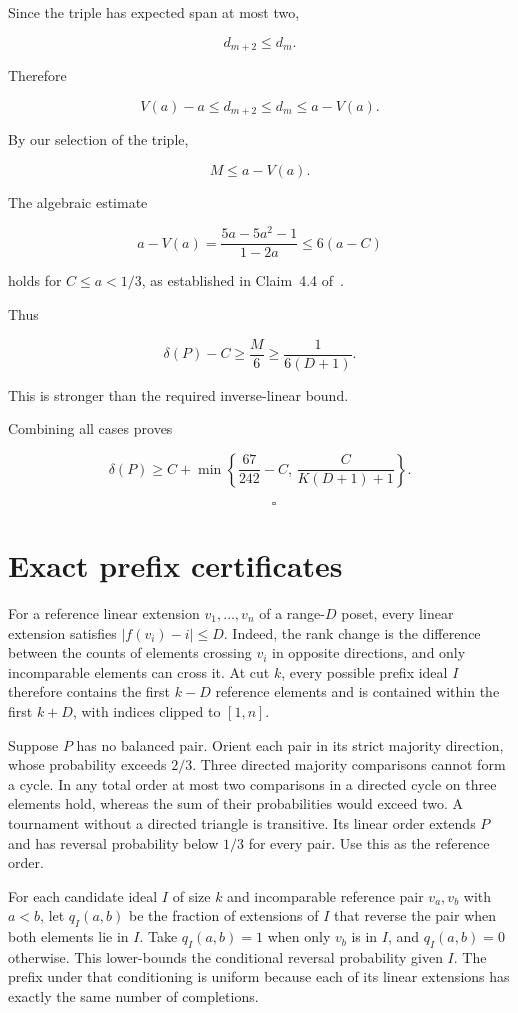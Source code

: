 \documentclass[11pt]{article}
\begin{document}
Since the triple has expected span at most two,

\[
d_{m+2}\leq d_m.
\]

Therefore

\[
V(a)-a\leq d_{m+2}
\leq d_m\leq a-V(a).
\]

By our selection of the triple,

\[
M\leq a-V(a).
\]

The algebraic estimate

\[
a-V(a)
=
\frac{5a-5a^2-1}{1-2a}
\leq6(a-C)
\]

holds for \(C\leq a<1/3\), as established in Claim~4.4 of~\cite{ACPP}.

Thus

\[
\delta(P)-C\geq\frac M6
\geq\frac1{6(D+1)}.
\]

This is stronger than the required inverse-linear bound.

Combining all cases proves

\[
\boxed{
\delta(P)\geq
C+\min\left\{
\frac{67}{242}-C,\,
\frac{C}{K(D+1)+1}
\right\}.
}
\]

\[
\qquad\square
\]

\section{Exact prefix certificates}

For a reference linear extension $v_1,\ldots,v_n$ of a range-$D$ poset, every linear extension satisfies $|f(v_i)-i|\le D$. Indeed, the rank change is the difference between the counts of elements crossing $v_i$ in opposite directions, and only incomparable elements can cross it. At cut $k$, every possible prefix ideal $I$ therefore contains the first $k-D$ reference elements and is contained within the first $k+D$, with indices clipped to $[1,n]$.

Suppose $P$ has no balanced pair. Orient each pair in its strict majority direction, whose probability exceeds $2/3$. Three directed majority comparisons cannot form a cycle. In any total order at most two comparisons in a directed cycle on three elements hold, whereas the sum of their probabilities would exceed two. A tournament without a directed triangle is transitive. Its linear order extends $P$ and has reversal probability below $1/3$ for every pair. Use this as the reference order.

For each candidate ideal $I$ of size $k$ and incomparable reference pair $v_a,v_b$ with $a<b$, let $q_I(a,b)$ be the fraction of extensions of $I$ that reverse the pair when both elements lie in $I$. Take $q_I(a,b)=1$ when only $v_b$ is in $I$, and $q_I(a,b)=0$ otherwise. This lower-bounds the conditional reversal probability given $I$. The prefix under that conditioning is uniform because each of its linear extensions has exactly the same number of completions.
\end{document}
